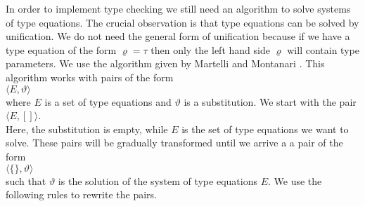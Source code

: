 In order to implement type checking we still need an algorithm to solve systems of type equations.
The crucial observation is that type equations can be solved by unification.  We do not
need the general form of unification because if we have a type equation of the form
 $\varrho = \tau$ then only the left hand side $\varrho$ will contain type parameters.
We use the algorithm given by  Martelli and Montanari \cite{martelliMontanari:82}.
This algorithm works with pairs of the form
\\[0.2cm]
\hspace*{1.3cm}
$\langle E, \vartheta \rangle$
\\[0.2cm]
where $E$ is a set of type equations and $\vartheta$ is a substitution. 
We start with the pair
\\[0.2cm]
\hspace*{1.3cm}
$\langle E, [] \rangle$. 
\\[0.2cm]
Here, the substitution is empty, while  $E$ is the set of type equations we want to solve.
These pairs will be gradually transformed until we arrive a a pair of the form
\\[0.2cm]
\hspace*{1.3cm}
$\langle \{\}, \vartheta \rangle$
\\[0.2cm]
such that $\vartheta$ is the solution of the system of type equations $E$.
We use the following rules to rewrite the pairs.
